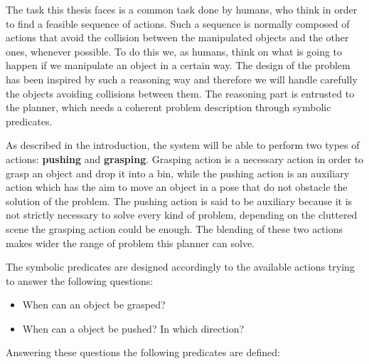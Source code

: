 The task this thesis faces is a common task done by humans, who think in order to find a feasible sequence of actions. Such a sequence is normally composed of actions that avoid the collision between the manipulated objects and the other ones, whenever possible. To do this we, as humans, think on what is going to happen if we manipulate an object in a certain way. The design of the problem has been inspired by such a reasoning way and therefore we will handle carefully the objects avoiding collisions between them. The reasoning part is entrusted to the planner, which needs a coherent problem description through symbolic predicates. 

As described in the introduction, the system will be able to perform two types of actions: \textbf{pushing} and \textbf{grasping}.
Grasping action is a necessary action in order to grasp an object and drop it into a bin, while the pushing action is an auxiliary action which has the aim to move an object in a pose that do not obstacle the solution of the problem. 
The pushing action is said to be auxiliary because it is not strictly necessary to solve every kind of problem, depending on the cluttered scene the grasping action could be enough.
The blending of these two actions makes wider the range of problem this planner can solve.    

The symbolic predicates are designed accordingly to the available actions trying to answer the following questions:
\begin{itemize}
\item When can an object be grasped? 
\item When can a object be pushed? In which direction? 
\end{itemize}
Answering these questions the following predicates are defined:

